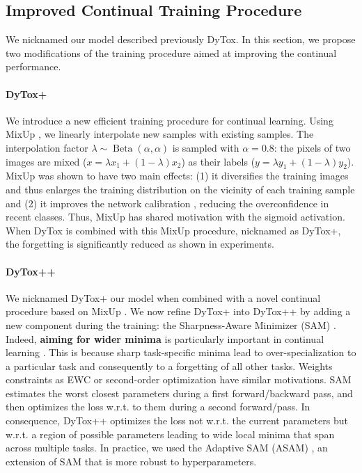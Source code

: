 \subsection{Improved Continual Training Procedure}

We nicknamed our model described previously DyTox. In this section, we propose two modifications
of the training procedure aimed at improving the continual performance.

\paragraph{DyTox+} We introduce a new efficient training procedure for continual learning. Using MixUp
\citep{hingyi2018mixup}, we linearly interpolate new samples with existing samples. The interpolation
factor $\lambda \sim \operatorname{Beta}(\alpha, \alpha)$ is sampled with $\alpha=0.8$: the pixels
of two images are mixed ($x = \lambda x_1 + (1 - \lambda) x_2$) as their labels ($y = \lambda y_1 +
    (1 - \lambda) y_2$). MixUp was shown to have two main effects: (1) it diversifies the training
images and thus enlarges the training distribution on the vicinity of each training sample
\citep{chapelle2001vicinalrisk} and (2) it improves the network calibration
\citep{guo2017miscalibration,thulasidasan2019mixupcalibration}, reducing the overconfidence in recent
classes. Thus, MixUp has shared motivation with the sigmoid activation. When DyTox is combined with
this MixUp procedure, nicknamed as DyTox+, the forgetting is significantly reduced as shown in
experiments.

\paragraph{DyTox++} We nicknamed DyTox+ our model when combined with a novel continual procedure
based on MixUp \citep{hingyi2018mixup}. We now refine DyTox+ into DyTox++ by adding a new component
during the training: the Sharpness-Aware Minimizer (SAM) \citep{foret2020sam}. Indeed, \textbf{aiming
    for wider minima} is particularly important in continual learning
\citep{kirkpatrick2017ewc,verwimp2021rehearsalrevealed}. This is because sharp task-specific minima
lead to over-specialization to a particular task and consequently to a forgetting of all other
tasks. Weights constraints as EWC \citep{kirkpatrick2017ewc} or second-order optimization
\citep{lee2020kroneckercontinual} have similar motivations. SAM estimates the worst closest
parameters during a first forward/backward pass, and then optimizes the loss w.r.t. to them during a
second forward/pass. In consequence, DyTox++ optimizes the loss not w.r.t. the current parameters
but w.r.t. a region of possible parameters leading to wide local minima that span across multiple
tasks. In practice, we used the Adaptive SAM (ASAM) \citep{kwon2021asam}, an extension of SAM that is
more robust to hyperparameters.


